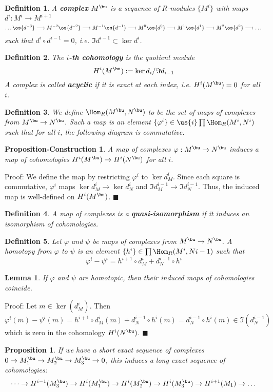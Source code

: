 \documentclass[10 pt]{article}
\newtheorem{lem}{Lemma}[section]
\newtheorem{prop}{Proposition}[section]
\newtheorem{propconstr}{Proposition-Construction}[section]
\newtheorem{defn}{Definition}[section]
\newcommand\bdefn{\begin{defn}}
\newcommand\blem{\begin{lem}}
\newcommand\bprop{\begin{prop}}
\newcommand\bpropconstr{\begin{propconstr}}
\newcommand\edefn{\end{defn}}
\newcommand\elem{\end{lem}}
\newcommand\eprop{\end{prop}}
\newcommand\epropconstr{\end{propconstr}}
\begin{document}
\bdefn A {\bf complex} $M^\bu$ is a sequence of $R$-modules $\{M^i\}$ with maps $d^i:M^i\rightarrow M^{i+1}$
$$\dots \os{d^{-3}}\longrightarrow M^{-2} \os{d^{-2}}\longrightarrow M^{-1} \os{d^{-1}}\longrightarrow M^0 \os{d^{0}}\longrightarrow M^1 \os{d^{1}}\longrightarrow M^2\os{d^{2}}\longrightarrow \dots$$
such that $d^i\circ d^{i-1}=0$, i.e. $\Im d^{i-1}\subset \ker d^i$.  \edefn

\bdefn The {\bf $i$-th cohomology} is the quotient module
$$H^i(M^\bu):= \ker d_i/\Im d_{i-1}$$
A complex is called {\bf acyclic} if it is exact at each index, i.e. $H^i(M^\bu)=0$ for all $i$.\edefn

\bdefn We define $\Hom_R(M^\bu,N^\bu)$ to be the set of maps of complexes from $M^\bu \rightarrow N^\bu$.  Such a map is an element $\{\varphi^i\}\in\us{i}\prod \Hom_R(M^i,N^i)$ such that for all $i$, the following diagram is commutative.

\edefn

\bpropconstr A map of complexes $\varphi:M^\bu\rightarrow N^\bu$ induces a map of cohomologies $H^i(M^\bu)\rightarrow H^i(N^\bu)$ for all $i$. \epropconstr

Proof:  We define the map by restricting $\varphi^i$ to $\ker d_M^i$.  Since each square is commutative, $\varphi^i$ maps $\ker d_M^i \rightarrow \ker d_N^i$ and $\Im d_M^{i-1}\rightarrow \Im d_N^{i-1}$.  Thus, the induced map is well-defined on $H^i(M^\bu)$. $\blacksquare$

\bdefn A map of complexes is a {\bf quasi-isomorphism} if it induces an isomorphism of cohomologies.\edefn

\bdefn Let $\varphi$ and $\psi$ be maps of complexes from $M^\bu\rightarrow N^\bu$.  A homotopy from $\varphi$ to $\psi$ is an element $\{h^i\}\in \prod \Hom_R(M^i,N{i-1})$ such that
$$\varphi^i-\psi^i = h^{i+1}\circ d^i_M + d^{i-1}_N\circ h^i$$
\edefn

\blem If $\varphi$ and $\psi$ are homotopic, then their induced maps of cohomologies coincide.\elem

Proof:  Let $m\in\ker(d^i_M)$.  Then
$$\varphi^i(m)-\psi^i(m)= h^{i+1}\circ d^i_M(m) + d^{i-1}_N\circ h^i(m)= d^{i-1}_N\circ h^i(m) \in \Im(d^{i-1}_N)$$
which is zero in the cohomology $H^i(N^\bu)$. $\blacksquare$

\bprop If we have a short exact sequence of complexes $0\rightarrow M_1^\bu\rightarrow M_2^\bu \rightarrow M_3^\bu\rightarrow 0$, this induces a long exact sequence of cohomologies:
$$\dots\rightarrow H^{i-1}(M_3^\bu)\rightarrow H^i(M_1^\bu)\rightarrow H^i(M_2^\bu)\rightarrow H^i(M_3^\bu) \rightarrow H^{i+1}(M_1)\rightarrow \dots$$
\eprop
\end{document}
